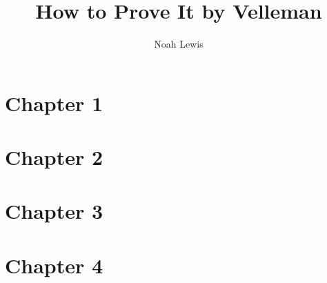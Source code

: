 \documentclass[10pt]{article}  %
\title{How to Prove It by Velleman}
\author{Noah Lewis}
\begin{document}
\maketitle

\tableofcontents

\section{Chapter 1}

\section{Chapter 2}

\section{Chapter 3}

\section{Chapter 4}

\end{document}
